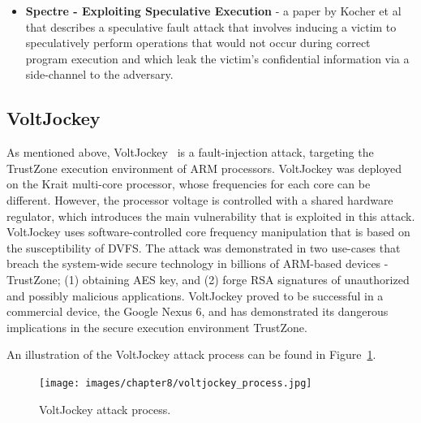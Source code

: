\begin{itemize}
	\begin{itemize}

		\item \textbf{Spectre - Exploiting Speculative Execution} - a paper by Kocher et al that describes
		a speculative fault attack that involves inducing a victim to speculatively perform operations
		that would not occur during correct program execution and which leak the victim's confidential
		information via a side-channel to the adversary.
		
	\end{itemize}

\end{itemize}

\subsection{VoltJockey}
As mentioned above, VoltJockey~\cite{qiu2019voltjockey} is a fault-injection attack, targeting the TrustZone execution environment of ARM processors.
VoltJockey was deployed on the Krait multi-core processor, whose frequencies for each core can be different.
However, the processor voltage is controlled with a shared hardware regulator, which introduces the main vulnerability that is exploited in this attack.
VoltJockey uses software-controlled core frequency manipulation that is based on the susceptibility of DVFS.
The attack was demonstrated in two use-cases that breach the system-wide secure technology in billions of ARM-based devices - TrustZone; (1) obtaining AES key, and (2) forge RSA signatures of unauthorized and possibly malicious applications.
VoltJockey proved to be successful in a commercial device, the Google Nexus 6, and has demonstrated its dangerous implications in the secure execution environment TrustZone.

An illustration of the VoltJockey attack process can be found in Figure~\ref{fig:voltjockey}.

\begin{figure}[!ht]
	\centering
	\texttt{[image: images/chapter8/voltjockey\_process.jpg]}
	\caption{VoltJockey attack process.}
	\label{fig:voltjockey}
\end{figure}